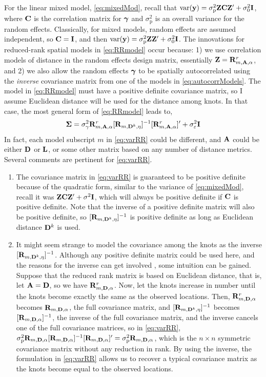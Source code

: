 \documentclass[11pt, titlepage]{article}\usepackage[]{graphicx}\usepackage[]{color}
\begin{document}
\begin{spacing}{1.9}
\begin{flushleft}
For the linear mixed model, \ref{eq:mixedMod}, recall that $\textrm{var}(\mathbf{y}) = \sigma^2_\textrm{p}\mathbf{Z}\mathbf{C}\mathbf{Z}^{\prime} + \sigma^2_0\mathbf{I}$, where $\mathbf{C}$ is the correlation matrix for $\mbox{\boldmath $\gamma$}$ and $\sigma^2_\textrm{p}$ is an overall variance for the random effects.  Classically, for mixed models, random effects are assumed independent, so $\mathbf{C} = \mathbf{I}$, and then $\textrm{var}(\mathbf{y}) = \sigma^2_\textrm{p}\mathbf{Z}\mathbf{Z}^{\prime} + \sigma^2_0\mathbf{I}$.  The innovations for reduced-rank spatial models in \ref{eq:RRmodel} occur because: 1) we use correlation models of distance in the random effects design matrix, essentially $\mathbf{Z} = \mathbf{R}^r_{m,\mathbf{A},\alpha}$, and 2) we also allow the random effects $\mbox{\boldmath $\gamma$}$ to be spatially autocorrelated using the \emph{inverse} covariance matrix from one of the models in \ref{eq:autocorrModels}.  The model in \ref{eq:RRmodel} must have a positive definite covariance matrix, so I assume Euclidean distance will be used for the distance among knots.  In that case, the most general form of \ref{eq:RRmodel} leads to,
\begin{equation} \label{eq:varRR}
				\mbox{\boldmath $\Sigma$} = \sigma^2_\gamma\mathbf{R}^r_{m,\mathbf{A},\alpha}[\mathbf{R}_{m,\mathbf{D}^k,\eta}]^{-1}[\mathbf{R}^r_{m,\mathbf{A},\alpha}]^{\prime} + \sigma^2_\varepsilon\mathbf{I}
\end{equation}
In fact, each model subscript $m$ in \ref{eq:varRR} could be different, and $\mathbf{A}$ could be either $\mathbf{D}$ or $\mathbf{L}$, or some other matrix based on any number of distance metrics.  Several comments are pertinent for \ref{eq:varRR}.
\begin{enumerate}
		\item The covariance matrix in \ref{eq:varRR} is guaranteed to be positive definite because of the quadratic form, similar to the variance of \ref{eq:mixedMod}, recall it was $\mathbf{Z}\mathbf{C}\mathbf{Z}^{\prime} + \sigma^2\mathbf{I}$, which will always be positive definite if $\mathbf{C}$ is positive definite.  Note that the inverse of a positive definite matrix will also be positive definite, so $[\mathbf{R}_{m,\mathbf{D}^k,\eta}]^{-1}$ is positive definite as long as  Euclidean distance $\mathbf{D}^k$ is used.
		\item It might seem strange to model the covariance among the knots as the inverse $[\mathbf{R}_{m,\mathbf{D}^k,\eta}]^{-1}$.    Although any positive definite matrix could be used here, and the reasons for the inverse can get involved \citep{Bane:Gelf:Finl:Sang:gaus:2008}, some intuition can be gained.  Suppose that the reduced rank matrix is based on Euclidean distance, that is, let $\mathbf{A} = \mathbf{D}$, so we have $\mathbf{R}^r_{m,\mathbf{D},\alpha}$. Now, let the knots increase in number until the knots become exactly the same as the observed locations. Then, $\mathbf{R}^r_{m,\mathbf{D},\alpha}$ becomes $\mathbf{R}_{m,\mathbf{D},\alpha}$, the full covariance matrix, and $[\mathbf{R}_{m,\mathbf{D}^k,\eta}]^{-1}$ becomes $[\mathbf{R}_{m,\mathbf{D},\alpha}]^{-1}$, the inverse of the full covariance matrix, and the inverse cancels one of the full covariance matrices, so in \ref{eq:varRR}, $\sigma^2_\textrm{p}\mathbf{R}_{m,\mathbf{D},\alpha}[\mathbf{R}_{m,\mathbf{D},\alpha}]^{-1}[\mathbf{R}_{m,\mathbf{D},\alpha}]^{\prime} = \sigma^2_\textrm{p}\mathbf{R}_{m,\mathbf{D},\alpha}$, which is the $n \times n$ symmetric covariance matrix without any reduction in rank.  By using the inverse, the formulation in \ref{eq:varRR} allows us to recover a typical covariance matrix as the knots become equal to the observed locations.

\end{enumerate}
\end{flushleft}
\end{spacing}
\end{document}
